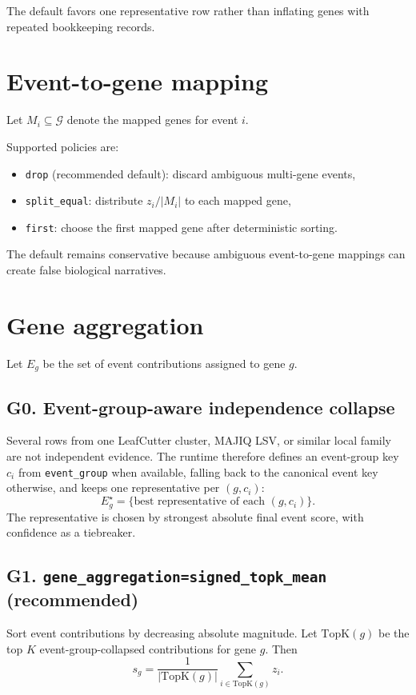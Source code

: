 \documentclass[11pt]{article}
\begin{document}
The default favors one representative row rather than inflating genes with repeated bookkeeping records.

\section{Event-to-gene mapping}
Let $M_i \subseteq \mathcal{G}$ denote the mapped genes for event $i$.

Supported policies are:
\begin{itemize}[leftmargin=2em]
\item \texttt{drop} (recommended default): discard ambiguous multi-gene events,
\item \texttt{split\_equal}: distribute $z_i / |M_i|$ to each mapped gene,
\item \texttt{first}: choose the first mapped gene after deterministic sorting.
\end{itemize}

The default remains conservative because ambiguous event-to-gene mappings can create false biological narratives.

\section{Gene aggregation}
Let $E_g$ be the set of event contributions assigned to gene $g$.

\subsection{G0. Event-group-aware independence collapse}
Several rows from one LeafCutter cluster, MAJIQ LSV, or similar local family are not independent evidence. The runtime therefore defines an event-group key $c_i$ from \texttt{event\_group} when available, falling back to the canonical event key otherwise, and keeps one representative per $(g, c_i)$:
\[
E_g^\star = \{ \text{best representative of each } (g, c_i) \}.
\]
The representative is chosen by strongest absolute final event score, with confidence as a tiebreaker.

\subsection{G1. \texttt{gene\_aggregation=signed\_topk\_mean} (recommended)}
Sort event contributions by decreasing absolute magnitude. Let $\mathrm{TopK}(g)$ be the top $K$ event-group-collapsed contributions for gene $g$. Then
\begin{equation}
s_g = \frac{1}{|\mathrm{TopK}(g)|} \sum_{i \in \mathrm{TopK}(g)} z_i.
\label{eq:topk_gene}
\end{equation}
\end{document}
